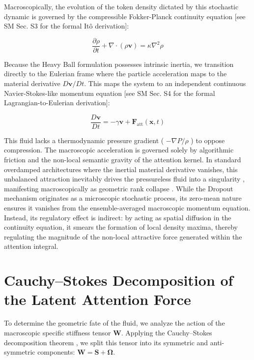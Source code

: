 \documentclass[10pt]{article}
\begin{document}
Macroscopically, the evolution of the token density dictated by this stochastic dynamic is governed by the compressible Fokker-Planck continuity equation [see SM Sec. S3 for the formal Itô derivation]:


\begin{equation}
\frac{\partial \rho}{\partial t}+\nabla \cdot(\rho \mathbf{v})=\kappa \nabla^{2} \rho
\end{equation}


Because the Heavy Ball formulation possesses intrinsic inertia, we transition directly to the Eulerian frame where the particle acceleration maps to the material derivative $D \mathbf{v} / D t$. This maps the system to an independent continuous Navier-Stokes-like momentum equation [see SM Sec. S4 for the formal Lagrangian-to-Eulerian derivation]:


\begin{equation}
\frac{D \mathbf{v}}{D t}=-\gamma \mathbf{v}+\mathbf{F}_{\mathrm{att}}(\mathbf{x}, t)
\end{equation}


This fluid lacks a thermodynamic pressure gradient ( $-\nabla P / \rho$ ) to oppose compression. The macroscopic acceleration is governed solely by algorithmic friction and the non-local semantic gravity of the attention kernel. In standard overdamped architectures where the inertial material derivative vanishes, this unbalanced attraction inevitably drives the pressureless fluid into a singularity \cite{ref10}, manifesting macroscopically as geometric rank collapse \cite{ref2}. While the Dropout mechanism originates as a microscopic stochastic process, its zero-mean nature ensures it vanishes from the ensemble-averaged macroscopic momentum equation. Instead, its regulatory effect is indirect: by acting as spatial diffusion in the continuity equation, it smears the formation of local density maxima, thereby regulating the magnitude of the non-local attractive force generated within the attention integral.

\section{Cauchy--Stokes Decomposition of the Latent Attention Force}

To determine the geometric fate of the fluid, we analyze the action of the macroscopic specific stiffness tensor $\mathbf{W}$. Applying the Cauchy--Stokes decomposition theorem \cite{ref11}, we split this tensor into its symmetric and anti-symmetric components: $\mathbf{W}=\mathbf{S}+\boldsymbol{\Omega}$.
\end{document}
